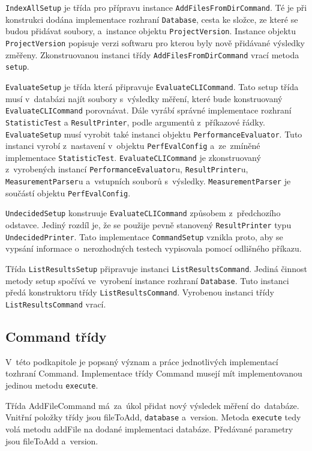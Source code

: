 \lstinline{IndexAllSetup} je třída pro přípravu instance \lstinline{AddFilesFromDirCommand}. Té je při konstrukci dodána
implementace rozhraní \lstinline{Database}, cesta ke složce, ze které se budou přidávat soubory,
a~instance objektu \lstinline{ProjectVersion}. Instance objektu \lstinline{ProjectVersion} popisuje verzi softwaru pro kterou
byly nově přidávané výsledky změřeny. Zkonstruovanou instanci třídy \lstinline{AddFilesFromDirCommand} vrací metoda \lstinline{setup}.

\lstinline{EvaluateSetup} je třída která připravuje \lstinline{EvaluateCLICommand}. Tato setup třída musí v~databázi najít
soubory s~výsledky měření, které bude konstruovaný \lstinline{EvaluateCLICommand} porovnávat. Dále vyrábí správné
implementace rozhraní \lstinline{StatisticTest} a \lstinline{ResultPrinter}, podle argumentů z~příkazové řádky.
\lstinline{EvaluateSetup} musí vyrobit také instanci objektu \lstinline{PerformanceEvaluator}. Tuto instanci vyrobí
z~nastavení v~objektu \lstinline{PerfEvalConfig} a~ze~zmíněné implementace \lstinline{StatisticTest}. \lstinline{EvaluateCLICommand} je zkonstruovaný
z~vyrobených instancí \lstinline{PerformanceEvaluator}u, \lstinline{ResultPrinter}u, \lstinline{MeasurementParser}u a~vstupních souborů s~výsledky.
\lstinline{MeasurementParser} je součástí objektu \lstinline{PerfEvalConfig}.

\lstinline{UndecidedSetup} konstruuje \lstinline{EvaluateCLICommand} způsobem z~předchozího odstavce.
Jediný rozdíl je, že se použije pevně stanovený \lstinline{ResultPrinter} typu \lstinline{UndecidedPrinter}.
Tato implementace \lstinline{CommandSetup} vznikla proto, aby se vypsání informace o~nerozhodných
testech vypisovala pomocí odlišného příkazu.

Třída \lstinline{ListResultsSetup} připravuje instanci \lstinline{ListResultsCommand}. Jediná činnost metody setup
spočívá ve~vyrobení instance rozhraní \lstinline{Database}. Tuto instanci předá konstruktoru
třídy \lstinline{ListResultsCommand}. Vyrobenou instanci třídy \lstinline{ListResultsCommand} vrací.

\subsection{Command třídy}

V~této podkapitole je popsaný význam a práce jednotlivých implementací tozhraní Command.
Implementace třídy Command musejí mít implementovanou jedinou metodu \lstinline{execute}.

Třída AddFileCommand má~za~úkol přidat nový výsledek měření do~databáze. Vnitřní položky
třídy jsou fileToAdd, \lstinline{database} a~version. Metoda \lstinline{execute} tedy volá metodu addFile na dodané implementaci
databáze. Předávané parametry jsou fileToAdd a~version.

